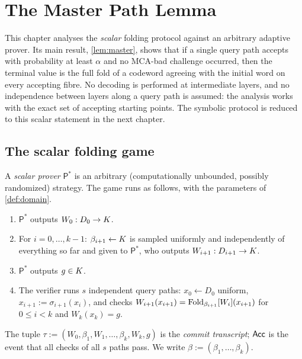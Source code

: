 \chapter{The Master Path Lemma}
\label{ch:path}

This chapter analyses the \emph{scalar} folding protocol against an arbitrary
adaptive prover. Its main result, \cref{lem:master}, shows that if a single query path
accepts with probability at least $\alpha$ and no MCA-bad challenge occurred, then the
terminal value is the full fold of a codeword agreeing with the initial word on every
accepting fibre. No decoding is performed at intermediate layers, and no independence
between layers along a query path is assumed: the analysis works with the exact set of
accepting starting points. The symbolic protocol is reduced to this scalar statement in the next chapter.

\section{The scalar folding game}

\begin{definition}\label{def:scalar-game}
A \emph{scalar prover} $\mathsf P^\ast$ is an arbitrary (computationally unbounded,
possibly randomized) strategy. The game runs as follows, with the parameters of
\cref{def:domain}.
\begin{enumerate}[label=\textup{S\arabic*.}]
\item $\mathsf P^\ast$ outputs $W_0:D_0\to K$.
\item For $i=0,\dots,k-1$: $\beta_{i+1}\leftarrow K$ is sampled uniformly and independently
of everything so far and given to $\mathsf P^\ast$, who outputs $W_{i+1}:D_{i+1}\to K$.
\item $\mathsf P^\ast$ outputs $g\in K$.
\item The verifier runs $s$ independent query paths: $x_0\leftarrow D_0$ uniform,
$x_{i+1}:=\sigma_{i+1}(x_i)$, and checks
$W_{i+1}(x_{i+1})=\mathrm{Fold}_{\beta_{i+1}}[W_i](x_{i+1})$ for $0\le i<k$ and $W_k(x_k)=g$.
\end{enumerate}
The tuple $\tau:=(W_0,\beta_1,W_1,\dots,\beta_k,W_k,g)$ is the \emph{commit transcript};
$\mathsf{Acc}$ is the event that all checks of all $s$ paths pass. We write
$\beta:=(\beta_1,\dots,\beta_k)$.
\end{definition}

